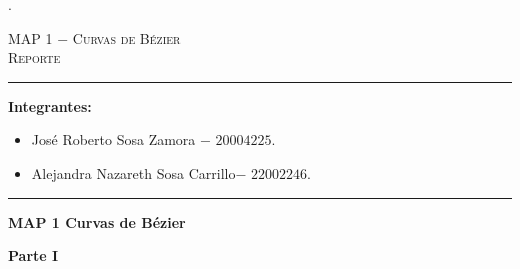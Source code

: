 \documentclass[11pt]{article}
\begin{document}


{\color{white}.}
\vspace{3 in}
\begin{center}
\Huge

\textsc{MAP 1  $-$ Curvas de Bézier  %
}
\\
\textsc{Reporte}

\end{center}


\vspace{3 in}
\hrule height 1.5pt
\vspace{0.1 in}

{\large
\noindent \textbf{Integrantes: } 
\begin{itemize}[nolistsep]
	\item José Roberto Sosa Zamora $-$ $20004225$.
	\item Alejandra Nazareth Sosa Carrillo$-$ $22002246$.
 \end{itemize}

}
\vspace{0.2 in}
\hrule height 1.5pt

\newpage
\vspace{0.1 in}


\begin{center}
	\Large	
	\textbf{MAP 1 Curvas de Bézier }
\end{center}

\noindent \textbf{Parte I }
\end{document}

